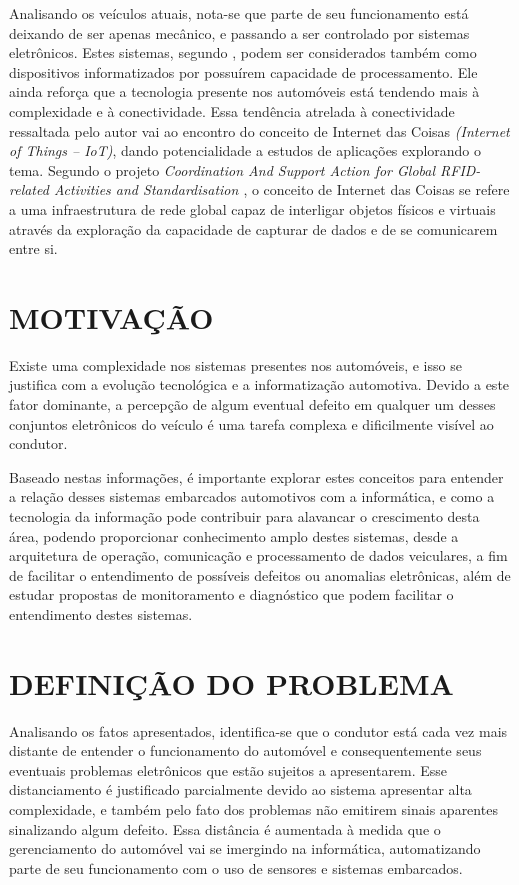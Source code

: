 Analisando os veículos atuais, nota-se que parte de seu funcionamento está deixando de ser apenas mecânico, e passando a ser controlado por sistemas eletrônicos. Estes sistemas, segundo , podem ser considerados também como dispositivos informatizados por possuírem capacidade de processamento. Ele ainda reforça que a tecnologia presente nos automóveis está tendendo mais à complexidade e à conectividade. Essa tendência atrelada à conectividade ressaltada pelo autor vai ao encontro do conceito de Internet das Coisas \textit{(Internet of Things – IoT)}, dando potencialidade a estudos de aplicações explorando o tema. Segundo o projeto \textit{Coordination And Support Action for Global RFID-related Activities and Standardisation \cite{casagras}}, o conceito de Internet das Coisas se refere a uma infraestrutura de rede global capaz de interligar objetos físicos e virtuais através da exploração da capacidade de capturar de dados e de se comunicarem entre si.

\section{MOTIVAÇÃO}
Existe uma complexidade nos sistemas presentes nos automóveis, e isso se justifica com a evolução tecnológica e a informatização automotiva. Devido a este fator dominante, a percepção de algum eventual defeito em qualquer um desses conjuntos eletrônicos do veículo é uma tarefa complexa e dificilmente visível ao condutor.

Baseado nestas informações, é importante explorar estes conceitos para entender a relação desses sistemas embarcados automotivos com a informática, e como a tecnologia da informação pode contribuir para alavancar o crescimento desta área, podendo proporcionar conhecimento amplo destes sistemas, desde a arquitetura de operação, comunicação e processamento de dados veiculares, a fim de facilitar o entendimento de possíveis defeitos ou anomalias eletrônicas, além de estudar propostas de monitoramento e diagnóstico que podem facilitar o entendimento destes sistemas.

\section{DEFINIÇÃO DO PROBLEMA}
Analisando os fatos apresentados, identifica-se que o condutor está cada vez mais distante de entender o funcionamento do automóvel e consequentemente seus eventuais problemas eletrônicos que estão sujeitos a apresentarem. Esse distanciamento é justificado parcialmente devido ao sistema apresentar alta complexidade, e também pelo fato dos problemas não emitirem sinais aparentes sinalizando algum defeito. Essa distância é aumentada à medida que o gerenciamento do automóvel vai se imergindo na informática, automatizando parte de seu funcionamento com o uso de sensores e sistemas embarcados.

